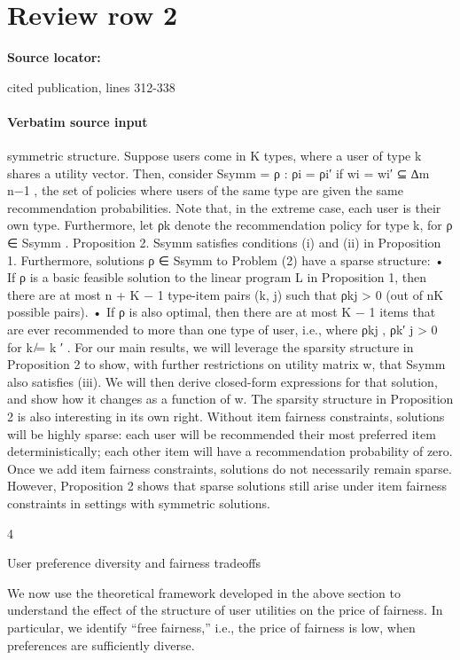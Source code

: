\documentclass[10pt]{article}
\begin{document}
\section*{Review row 2}
\textbf{Source locator:} {\footnotesize\raggedright cited publication, lines 312-\allowbreak{}338\par}
\paragraph{Verbatim source input}
\begin{ReviewVerbatim}
symmetric structure. Suppose users come in K types, where a user of type k shares a utility vector.
Then, consider Ssymm = {ρ : ρi = ρi′ if wi = wi′ } ⊆ ∆m
n−1 , the set of policies where users of the
same type are given the same recommendation probabilities. Note that, in the extreme case, each user
is their own type. Furthermore, let ρk denote the recommendation policy for type k, for ρ ∈ Ssymm .
Proposition 2. Ssymm satisfies conditions (i) and (ii) in Proposition 1. Furthermore, solutions
ρ ∈ Ssymm to Problem (2) have a sparse structure:
• If ρ is a basic feasible solution to the linear program L in Proposition 1, then there are at
most n + K − 1 type-item pairs (k, j) such that ρkj > 0 (out of nK possible pairs).
• If ρ is also optimal, then there are at most K − 1 items that are ever recommended to more
than one type of user, i.e., where ρkj , ρk′ j > 0 for k ̸= k ′ .
For our main results, we will leverage the sparsity structure in Proposition 2 to show, with further
restrictions on utility matrix w, that Ssymm also satisfies (iii). We will then derive closed-form
expressions for that solution, and show how it changes as a function of w.
The sparsity structure in Proposition 2 is also interesting in its own right. Without item fairness
constraints, solutions will be highly sparse: each user will be recommended their most preferred item
deterministically; each other item will have a recommendation probability of zero. Once we add item
fairness constraints, solutions do not necessarily remain sparse. However, Proposition 2 shows that
sparse solutions still arise under item fairness constraints in settings with symmetric solutions.

4

User preference diversity and fairness tradeoffs

We now use the theoretical framework developed in the above section to understand the effect of the
structure of user utilities on the price of fairness. In particular, we identify “free fairness,” i.e., the
price of fairness is low, when preferences are sufficiently diverse.


\end{ReviewVerbatim}
\end{document}
